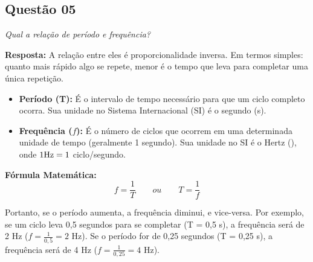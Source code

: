\subsection*{Questão 05}

\textit{Qual a relação de período e frequência? }

\textbf{Resposta:} 
A relação entre eles é proporcionalidade inversa. Em termos simples: quanto mais rápido algo se repete, menor é o tempo que leva para completar uma única repetição.

\begin{itemize}
    \item \textbf{Período (T):} É o intervalo de tempo necessário para que um ciclo completo ocorra. Sua unidade no Sistema Internacional (SI) é o segundo (s).
    \item \textbf{Frequência ($f$):} É o número de ciclos que ocorrem em uma determinada unidade de tempo (geralmente 1 segundo).
    Sua unidade no SI é o Hertz (\hz), onde $1 \text{Hz} = 1$ ciclo/segundo.
\end{itemize}

\textbf{Fórmula Matemática:}
\begin{equation}
    f = \frac{1}{T} \qquad ou \qquad T = \frac{1}{f}
\end{equation}

Portanto, se o período aumenta, a frequência diminui, e vice-versa.
Por exemplo, se um ciclo leva 0,5 segundos para se completar (T = 0,5 s), a frequência será de 2 Hz ($f = \frac{1}{0,5} = 2$ Hz).
Se o período for de 0,25 segundos (T = 0,25 s), a frequência será de 4 Hz ($f = \frac{1}{0,25} = 4$ Hz).